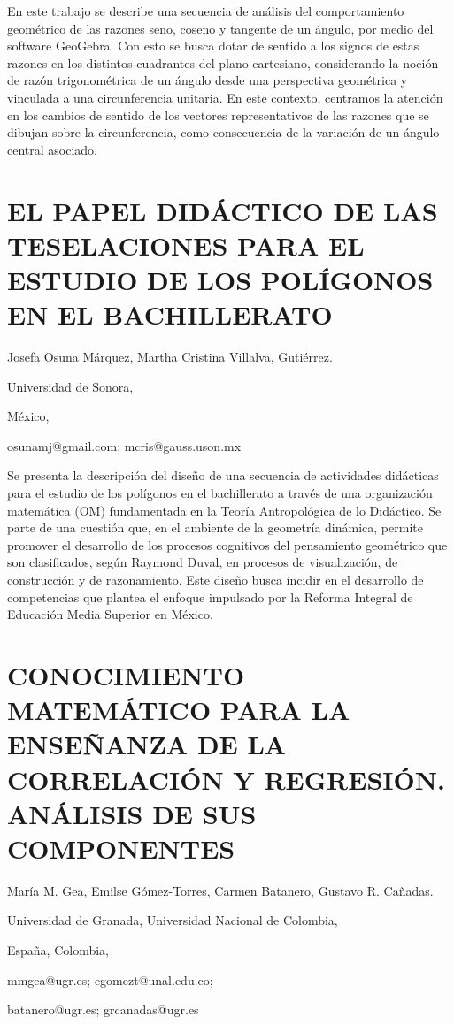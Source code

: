 En este trabajo se describe una secuencia de análisis del comportamiento
geométrico de las razones seno, coseno y tangente de un ángulo, por
medio del software GeoGebra. Con esto se busca dotar de sentido a
los signos de estas razones en los distintos cuadrantes del plano
cartesiano, considerando la noción de razón trigonométrica de un ángulo
desde una perspectiva geométrica y vinculada a una circunferencia
unitaria. En este contexto, centramos la atención en los cambios de
sentido de los vectores representativos de las razones que se dibujan
sobre la circunferencia, como consecuencia de la variación de un ángulo
central asociado. 


\section{EL PAPEL DIDÁCTICO DE LAS TESELACIONES PARA EL ESTUDIO DE LOS POLÍGONOS
EN EL BACHILLERATO }

\begin{datos}

Josefa Osuna Márquez, Martha Cristina Villalva, Gutiérrez.

Universidad de Sonora,

México,

osunamj@gmail.com; mcris@gauss.uson.mx

\end{datos}

Se presenta la descripción del diseño de una secuencia de actividades
didácticas para el estudio de los polígonos en el bachillerato a través
de una organización matemática (OM) fundamentada en la Teoría Antropológica
de lo Didáctico. Se parte de una cuestión que, en el ambiente de la
geometría dinámica, permite promover el desarrollo de los procesos
cognitivos del pensamiento geométrico que son clasificados, según
Raymond Duval, en procesos de visualización, de construcción y de
razonamiento. Este diseño busca incidir en el desarrollo de competencias
que plantea el enfoque impulsado por la Reforma Integral de Educación
Media Superior en México.


\section{CONOCIMIENTO MATEMÁTICO PARA LA ENSEÑANZA DE LA CORRELACIÓN Y REGRESIÓN.
ANÁLISIS DE SUS COMPONENTES}

\begin{datos}

María M. Gea, Emilse Gómez-Torres, Carmen Batanero, Gustavo R. Cañadas.

Universidad de Granada, Universidad Nacional de Colombia,

España, Colombia,

mmgea@ugr.es; egomezt@unal.edu.co;

batanero@ugr.es; grcanadas@ugr.es

\end{datos}

